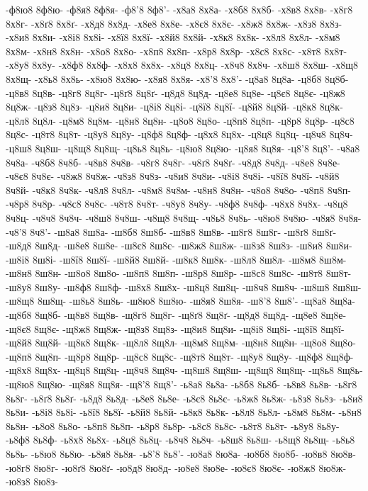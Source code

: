 {-ф8ю8
8ф8ю-
-ф8я8
8ф8я-
-ф8'8
8ф8'-
-х8а8
8х8а-
-х8б8
8х8б-
-х8в8
8х8в-
-х8г8
8х8г-
-х8ґ8
8х8ґ-
-х8д8
8х8д-
-х8е8
8х8е-
-х8є8
8х8є-
-х8ж8
8х8ж-
-х8з8
8х8з-
-х8и8
8х8и-
-х8і8
8х8і-
-х8ї8
8х8ї-
-х8й8
8х8й-
-х8к8
8х8к-
-х8л8
8х8л-
-х8м8
8х8м-
-х8н8
8х8н-
-х8о8
8х8о-
-х8п8
8х8п-
-х8р8
8х8р-
-х8с8
8х8с-
-х8т8
8х8т-
-х8у8
8х8у-
-х8ф8
8х8ф-
-х8х8
8х8х-
-х8ц8
8х8ц-
-х8ч8
8х8ч-
-х8ш8
8х8ш-
-х8щ8
8х8щ-
-х8ь8
8х8ь-
-х8ю8
8х8ю-
-х8я8
8х8я-
-х8'8
8х8'-
-ц8а8
8ц8а-
-ц8б8
8ц8б-
-ц8в8
8ц8в-
-ц8г8
8ц8г-
-ц8ґ8
8ц8ґ-
-ц8д8
8ц8д-
-ц8е8
8ц8е-
-ц8є8
8ц8є-
-ц8ж8
8ц8ж-
-ц8з8
8ц8з-
-ц8и8
8ц8и-
-ц8і8
8ц8і-
-ц8ї8
8ц8ї-
-ц8й8
8ц8й-
-ц8к8
8ц8к-
-ц8л8
8ц8л-
-ц8м8
8ц8м-
-ц8н8
8ц8н-
-ц8о8
8ц8о-
-ц8п8
8ц8п-
-ц8р8
8ц8р-
-ц8с8
8ц8с-
-ц8т8
8ц8т-
-ц8у8
8ц8у-
-ц8ф8
8ц8ф-
-ц8х8
8ц8х-
-ц8ц8
8ц8ц-
-ц8ч8
8ц8ч-
-ц8ш8
8ц8ш-
-ц8щ8
8ц8щ-
-ц8ь8
8ц8ь-
-ц8ю8
8ц8ю-
-ц8я8
8ц8я-
-ц8'8
8ц8'-
-ч8а8
8ч8а-
-ч8б8
8ч8б-
-ч8в8
8ч8в-
-ч8г8
8ч8г-
-ч8ґ8
8ч8ґ-
-ч8д8
8ч8д-
-ч8е8
8ч8е-
-ч8є8
8ч8є-
-ч8ж8
8ч8ж-
-ч8з8
8ч8з-
-ч8и8
8ч8и-
-ч8і8
8ч8і-
-ч8ї8
8ч8ї-
-ч8й8
8ч8й-
-ч8к8
8ч8к-
-ч8л8
8ч8л-
-ч8м8
8ч8м-
-ч8н8
8ч8н-
-ч8о8
8ч8о-
-ч8п8
8ч8п-
-ч8р8
8ч8р-
-ч8с8
8ч8с-
-ч8т8
8ч8т-
-ч8у8
8ч8у-
-ч8ф8
8ч8ф-
-ч8х8
8ч8х-
-ч8ц8
8ч8ц-
-ч8ч8
8ч8ч-
-ч8ш8
8ч8ш-
-ч8щ8
8ч8щ-
-ч8ь8
8ч8ь-
-ч8ю8
8ч8ю-
-ч8я8
8ч8я-
-ч8'8
8ч8'-
-ш8а8
8ш8а-
-ш8б8
8ш8б-
-ш8в8
8ш8в-
-ш8г8
8ш8г-
-ш8ґ8
8ш8ґ-
-ш8д8
8ш8д-
-ш8е8
8ш8е-
-ш8є8
8ш8є-
-ш8ж8
8ш8ж-
-ш8з8
8ш8з-
-ш8и8
8ш8и-
-ш8і8
8ш8і-
-ш8ї8
8ш8ї-
-ш8й8
8ш8й-
-ш8к8
8ш8к-
-ш8л8
8ш8л-
-ш8м8
8ш8м-
-ш8н8
8ш8н-
-ш8о8
8ш8о-
-ш8п8
8ш8п-
-ш8р8
8ш8р-
-ш8с8
8ш8с-
-ш8т8
8ш8т-
-ш8у8
8ш8у-
-ш8ф8
8ш8ф-
-ш8х8
8ш8х-
-ш8ц8
8ш8ц-
-ш8ч8
8ш8ч-
-ш8ш8
8ш8ш-
-ш8щ8
8ш8щ-
-ш8ь8
8ш8ь-
-ш8ю8
8ш8ю-
-ш8я8
8ш8я-
-ш8'8
8ш8'-
-щ8а8
8щ8а-
-щ8б8
8щ8б-
-щ8в8
8щ8в-
-щ8г8
8щ8г-
-щ8ґ8
8щ8ґ-
-щ8д8
8щ8д-
-щ8е8
8щ8е-
-щ8є8
8щ8є-
-щ8ж8
8щ8ж-
-щ8з8
8щ8з-
-щ8и8
8щ8и-
-щ8і8
8щ8і-
-щ8ї8
8щ8ї-
-щ8й8
8щ8й-
-щ8к8
8щ8к-
-щ8л8
8щ8л-
-щ8м8
8щ8м-
-щ8н8
8щ8н-
-щ8о8
8щ8о-
-щ8п8
8щ8п-
-щ8р8
8щ8р-
-щ8с8
8щ8с-
-щ8т8
8щ8т-
-щ8у8
8щ8у-
-щ8ф8
8щ8ф-
-щ8х8
8щ8х-
-щ8ц8
8щ8ц-
-щ8ч8
8щ8ч-
-щ8ш8
8щ8ш-
-щ8щ8
8щ8щ-
-щ8ь8
8щ8ь-
-щ8ю8
8щ8ю-
-щ8я8
8щ8я-
-щ8'8
8щ8'-
-ь8а8
8ь8а-
-ь8б8
8ь8б-
-ь8в8
8ь8в-
-ь8г8
8ь8г-
-ь8ґ8
8ь8ґ-
-ь8д8
8ь8д-
-ь8е8
8ь8е-
-ь8є8
8ь8є-
-ь8ж8
8ь8ж-
-ь8з8
8ь8з-
-ь8и8
8ь8и-
-ь8і8
8ь8і-
-ь8ї8
8ь8ї-
-ь8й8
8ь8й-
-ь8к8
8ь8к-
-ь8л8
8ь8л-
-ь8м8
8ь8м-
-ь8н8
8ь8н-
-ь8о8
8ь8о-
-ь8п8
8ь8п-
-ь8р8
8ь8р-
-ь8с8
8ь8с-
-ь8т8
8ь8т-
-ь8у8
8ь8у-
-ь8ф8
8ь8ф-
-ь8х8
8ь8х-
-ь8ц8
8ь8ц-
-ь8ч8
8ь8ч-
-ь8ш8
8ь8ш-
-ь8щ8
8ь8щ-
-ь8ь8
8ь8ь-
-ь8ю8
8ь8ю-
-ь8я8
8ь8я-
-ь8'8
8ь8'-
-ю8а8
8ю8а-
-ю8б8
8ю8б-
-ю8в8
8ю8в-
-ю8г8
8ю8г-
-ю8ґ8
8ю8ґ-
-ю8д8
8ю8д-
-ю8е8
8ю8е-
-ю8є8
8ю8є-
-ю8ж8
8ю8ж-
-ю8з8
8ю8з-
}
